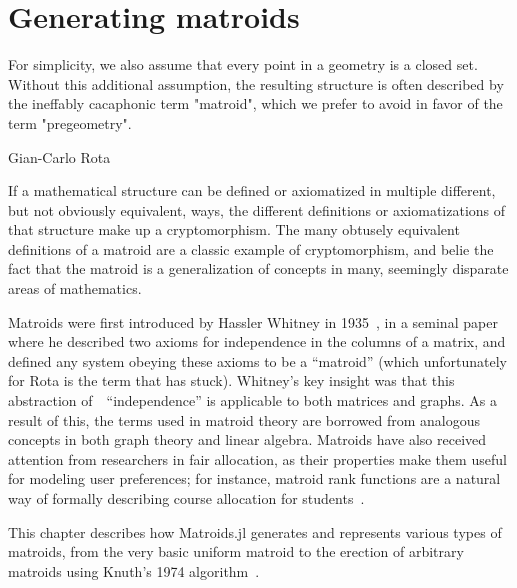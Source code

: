 \chapter{Generating matroids}
\epigraph{For simplicity, we also assume that every point in a geometry is a closed set. Without this additional assumption, the resulting structure is often described by the ineffably cacaphonic term "matroid", which we prefer to avoid in favor of the term "pregeometry".}{Gian-Carlo Rota \cite{crapo_rota_1970}}

If a mathematical structure can be defined or axiomatized in multiple different, but not obviously equivalent, ways, the different definitions or axiomatizations of that structure make up a cryptomorphism. The many obtusely equivalent definitions of a matroid are a classic example of cryptomorphism, and belie the fact that the matroid is a generalization of concepts in many, seemingly disparate areas of mathematics.

Matroids were first introduced by Hassler Whitney in 1935~\cite{whitney-1935}, in a seminal paper where he described two axioms for independence in the columns of a matrix, and defined any system obeying these axioms to be a ``matroid'' (which unfortunately for Rota is the term that has stuck). Whitney's key insight was that this abstraction of~~``independence'' is applicable to both matrices and graphs. As a result of this, the terms used in matroid theory are borrowed from analogous concepts in both graph theory and linear algebra. Matroids have also received attention from researchers in fair allocation, as their properties make them useful for modeling user preferences; for instance, matroid rank functions are a natural way of formally describing course allocation for students~\cite{benabbou-2021}. 

This chapter describes how Matroids.jl generates and represents various types of matroids, from the very basic uniform matroid to the erection of arbitrary matroids using Knuth's 1974 algorithm~\cite{knuth-1975}. 







